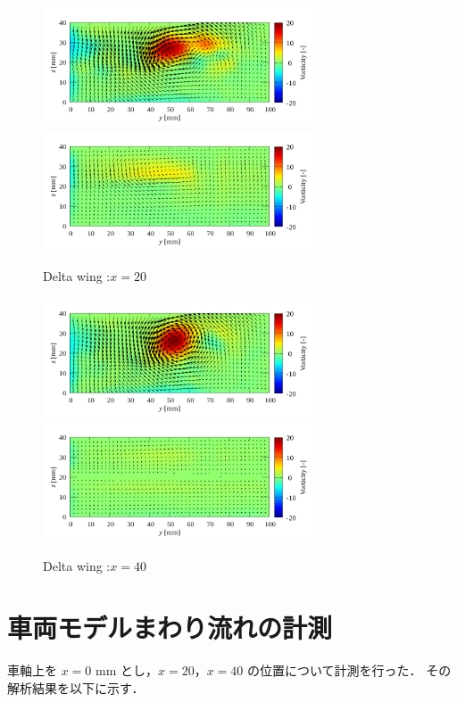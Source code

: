 \documentclass[twocolumn,a4j]{jsarticle}
\begin{document}
\newpage
\begin{figure}[htbp]
  \centering
  {
    \includegraphics[keepaspectratio, width=80mm]{../images/Simulation/Compare/experiment_x=20.png}
    \includegraphics[keepaspectratio, width=80mm]{../images/Simulation/Compare/simulation_x=20.png}
  }
  \caption{Delta wing :$x=20$}
  {
    \includegraphics[keepaspectratio, width=80mm]{../images/Simulation/Compare/experiment_x=40.png}
    \includegraphics[keepaspectratio, width=80mm]{../images/Simulation/Compare/simulation_x=40.png}
  }
  \caption{Delta wing :$x=40$}
\end{figure}

\newpage
\section{車両モデルまわり流れの計測}
車軸上を $x=0$ mm とし，$x=20$，$x=40$ の位置について計測を行った．
その解析結果を以下に示す．
\end{document}
